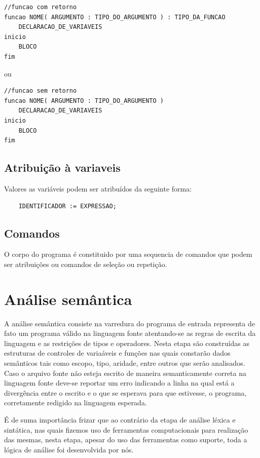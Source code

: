 \documentclass[a4paper,12pt]{report}
\begin{document}
\begin{verbatim}
//funcao com retorno
funcao NOME( ARGUMENTO : TIPO_DO_ARGUMENTO ) : TIPO_DA_FUNCAO
	DECLARACAO_DE_VARIAVEIS
inicio
	BLOCO
fim
\end{verbatim}
ou
\begin{verbatim}
//funcao sem retorno
funcao NOME( ARGUMENTO : TIPO_DO_ARGUMENTO )
	DECLARACAO_DE_VARIAVEIS
inicio
	BLOCO
fim
\end{verbatim}


\subsection{Atribui\c{c}\~ao \`a variaveis}

Valores as vari\'aveis podem ser atribu\'idos da seguinte forma:

\begin{verbatim}
	IDENTIFICADOR := EXPRESSAO;
\end{verbatim}

\subsection{Comandos}

O corpo do programa \'e constituido por uma sequencia de comandos que podem ser atribui\c{c}\~oes ou comandos de sele\c{c}\~ao ou repeti\c{c}\~ao.

\section{An\'alise sem\^antica}

A an\'alise sem\^antica consiste na varredura do programa de entrada representa de fato
um programa v\'alido na linguagem fonte atentando-se as regras de escrita da linguagem e 
as restri\c{c}\~oes de tipos e operadores. Nesta etapa s\~ao constru\'idas as estruturas de
controles de varia\'aveis e fun\c{c}\~oes nas quais constar\~ao dados sem\^anticos tais como
escopo, tipo, aridade, entre outros que ser\~ao analisados. Caso o arquivo fonte n\~ao esteja 
escrito de maneira semanticamente correta na linguagem fonte deve-se
reportar um erro indicando a linha na qual est\'a a diverg\^encia entre o escrito e o que 
se esperava para que estivesse, o programa, corretamente redigido na linguagem esperada.

\'E de suma import\^ancia frizar que ao contr\'ario da etapa de an\'alise l\'exica e 
sint\'atica, nas quais fizemos uso de ferramentas computacionais para realiza\c{c}\~ao das 
mesmas, nesta etapa, apesar do uso das ferramentas como suporte, toda a l\'ogica de an\'alise
foi desenvolvida por n\'os.
\end{document}
